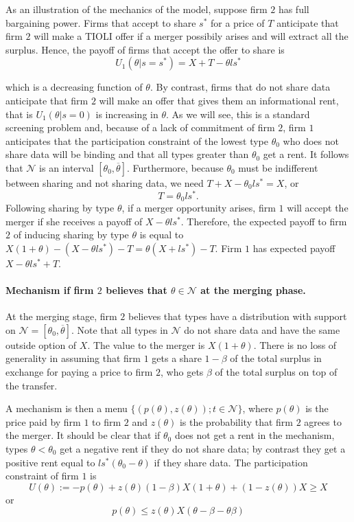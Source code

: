 \documentclass[a4paper]{article}
\newcommand{\N}{\mathcal N}
\renewcommand{\t}{\theta}
\renewcommand{\b}{\beta}
\begin{document}
As an illustration of the mechanics of the model, suppose firm $2$ has full bargaining power. Firms that accept to share $s^*$ for a price of $T$ anticipate that firm $2$ will make a TIOLI offer if a merger possibily arises and will extract all the surplus. Hence, the payoff of firms that accept the offer to share is   
%
\[
U_1(\t|s=s^*)=X+T-\t l s^*
\]
%

which is a decreasing function of $\t$. By contrast, firms that do not share data anticipate that firm $2$ will make an offer that gives them an informational rent, that is $U_1(\t|s=0)$ is increasing in $\t$. As we will see, this is a standard screening problem and, because of a lack of commitment of firm $2$, firm $1$ anticipates that the participation constraint of the lowest type $\t_0$ who does not share data will be binding and that all types greater than $\t_0$ get a rent. It follows that $\N$ is an interval $[\theta_0,\overline \t]$. Furthermore, because $\t_0$ must be indifferent between sharing and not sharing data, we need $T+X-\t_0 l s^*=X$, or
\begin{equation}\label{eq:T}
  T=\t_0 l s^*.
\end{equation}
%
Following sharing by type $\t$, if a merger opportunity arises, firm $1$ will accept the merger if she receives a payoff of $X-\t l s^*$. Therefore, the expected payoff to firm $2$ of inducing sharing by type $\t$ is equal to $X(1+\t)-(X-\t ls^*)-T=\t(X+ls^*)-T$. Firm $1$ has expected payoff $X-\t ls^*+T$.

\paragraph{Mechanism if firm $2$ believes that $\t\in\N$ at the merging phase.} At the merging stage, firm $2$ believes that types have a distribution with support on $\N=[\t_0,\overline \t]$. Note that all types in $\N$ do not share data and have the same outside option of $X$. The value to the merger is $X(1+\t)$. There is no loss of generality in assuming that firm $1$ gets a share $1-\b$ of the total surplus in exchange for paying a price to firm $2$, who gets $\b$ of the total surplus on top of the transfer.

A mechanism is then a menu $\{(p(\t),z(\t));t\in \N\}$, where $p(\t)$ is the price paid by firm $1$ to firm $2$ and $z(\t)$ is the probability that firm $2$ agrees to the merger. It should be clear that if $\t_0$ does not get a rent in the mechanism, types $\t<\t_0$ get a negative rent if they do not share data; by contrast they get a positive rent equal to $ls^* (\t_0-\t)$ if they share data. The participation constraint of firm $1$ is
\begin{equation}
  U(\t):=-p(\t)+z(\t) (1-\beta) X(1+\t)+(1-z(\t))X\geq X 
\end{equation}
or
\begin{equation*}
  p(\t)\leq z(\t)X (\t-\beta-\t \beta)
\end{equation*}
\end{document}
